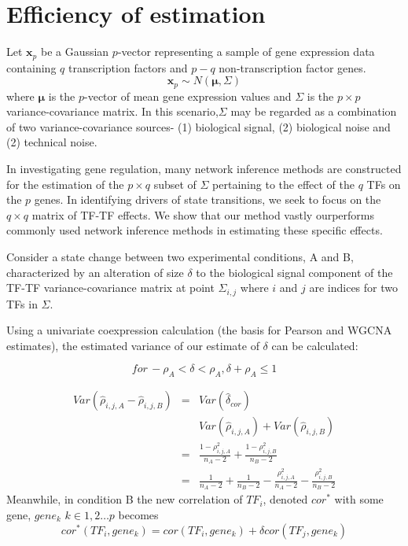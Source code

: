 \documentclass[english]{article}
\begin{document}
\section*{Efficiency of estimation}

Let $\mathbf{x}_{p}$ be a Gaussian $p$-vector representing a sample
of gene expression data containing $q$ transcription factors and
$p-q$ non-transcription factor genes. 
\[
\mathbf{x}_{p}\sim N\left(\mathbf{\mu},\Sigma\right)
\]
where $\mathbf{\mu}$ is the $p$-vector of mean gene expression values
and $\Sigma$ is the $p\times p$ variance-covariance matrix. In this
scenario,$\Sigma$ may be regarded as a combination of two variance-covariance
sources- (1) biological signal, (2) biological noise and (2) technical
noise.

In investigating gene regulation, many network inference methods are
constructed for the estimation of the $p\times q$ subset of $\Sigma$
pertaining to the effect of the $q$ TFs on the $p$ genes. In identifying
drivers of state transitions, we seek to focus on the $q\times q$
matrix of TF-TF effects. We show that our method vastly ourperforms
commonly used network inference methods in estimating these specific
effects.

Consider a state change between two experimental conditions, A and
B, characterized by an alteration of size $\delta$ to the biological
signal component of the TF-TF variance-covariance matrix at point
$\Sigma_{i,j}$ where $i$ and $j$ are indices for two TFs in $\Sigma$.

Using a univariate coexpression calculation (the basis for Pearson
and WGCNA estimates), the estimated variance of our estimate of $\delta$
can be calculated:

\[
for\,-\rho_{A}<\delta<\rho_{A},\delta+\rho_{A}\le1
\]


\begin{eqnarray*}
Var\left(\hat{\rho}_{i,j,A}-\hat{\rho}_{i,j,B}\right) & = & Var\left(\hat{\delta}_{cor}\right)\\
 &  & Var\left(\hat{\rho}_{i,j,A}\right)+Var\left(\hat{\rho}_{i,j,B}\right)\\
 & = & \frac{1-\rho_{i,j,A}^{2}}{n_{A}-2}+\frac{1-\rho_{i,j,B}^{2}}{n_{B}-2}\\
 & = & \frac{1}{n_{A}-2}+\frac{1}{n_{B}-2}-\frac{\rho_{i,j,A}^{2}}{n_{A}-2}-\frac{\rho_{i,j,B}^{2}}{n_{B}-2}
\end{eqnarray*}
Meanwhile, in condition B the new correlation of $TF_{i}$, denoted
$cor^{*}$ with some gene, $gene_{k}$ $k\in1,2\dots p$ becomes
\[
cor^{*}\left(TF_{i},gene_{k}\right)=cor\left(TF_{i},gene_{k}\right)+\delta cor\left(TF_{j},gene_{k}\right)
\]
 
\end{document}
